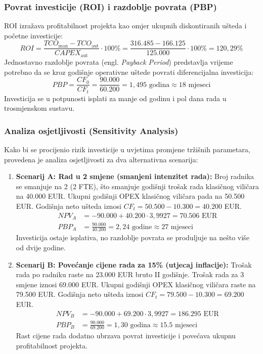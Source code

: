 \documentclass[12pt,a4paper]{article}
\begin{document}
\subsubsection{Povrat investicije (ROI) i razdoblje povrata (PBP)}
ROI izražava profitabilnost projekta kao omjer ukupnih diskontiranih ušteda i početne investicije:
\begin{equation}
    ROI = \frac{TCO_{\text{man}} - TCO_{\text{aut}}}{CAPEX_{\text{aut}}} \cdot 100\% = \frac{316.485 - 166.125}{125.000} \cdot 100\% = 120,29\%
\end{equation}
Jednostavno razdoblje povrata (engl. \textit{Payback Period}) predstavlja vrijeme potrebno da se kroz godišnje operativne uštede povrati diferencijalna investicija:
\begin{equation}
    PBP = \frac{CF_0}{CF_t} = \frac{90.000}{60.200} = 1,495\text{ godina} \approx 18\text{ mjeseci}
\end{equation}
Investicija se u potpunosti isplati za manje od godinu i pol dana rada u trosmjenskom sustavu.

\subsubsection{Analiza osjetljivosti (Sensitivity Analysis)}
Kako bi se procijenio rizik investicije u uvjetima promjene tržišnih parametara, provedena je analiza osjetljivosti za dva alternativna scenarija:
\begin{enumerate}
    \item \textbf{Scenarij A: Rad u 2 smjene (smanjeni intenzitet rada):}
    Broj radnika se smanjuje na 2 (2 FTE), što smanjuje godišnji trošak rada klasičnog viličara na 40.000 EUR. Ukupni godišnji OPEX klasičnog viličara pada na 50.500 EUR. Godišnja neto ušteda iznosi $CF_t = 50.500 - 10.300 = 40.200$ EUR.
    \begin{align*}
        NPV_A &= -90.000 + 40.200 \cdot 3,9927 = 70.506\text{ EUR} \\
        PBP_A &= \frac{90.000}{40.200} = 2,24\text{ godine} \approx 27\text{ mjeseci}
    \end{align*}
    Investicija ostaje isplativa, no razdoblje povrata se produljuje na nešto više od dvije godine.
    \item \textbf{Scenarij B: Povećanje cijene rada za 15\% (utjecaj inflacije):}
    Trošak rada po radniku raste na 23.000 EUR bruto II godišnje. Trošak rada za 3 smjene iznosi 69.000 EUR. Ukupni godišnji OPEX klasičnog viličara raste na 79.500 EUR. Godišnja neto ušteda iznosi $CF_t = 79.500 - 10.300 = 69.200$ EUR.
    \begin{align*}
        NPV_B &= -90.000 + 69.200 \cdot 3,9927 = 186.295\text{ EUR} \\
        PBP_B &= \frac{90.000}{69.200} = 1,30\text{ godina} \approx 15.5\text{ mjeseci}
    \end{align*}
    Rast cijene rada dodatno ubrzava povrat investicije i povećava ukupnu profitabilnost projekta.
\end{enumerate}
\end{document}
